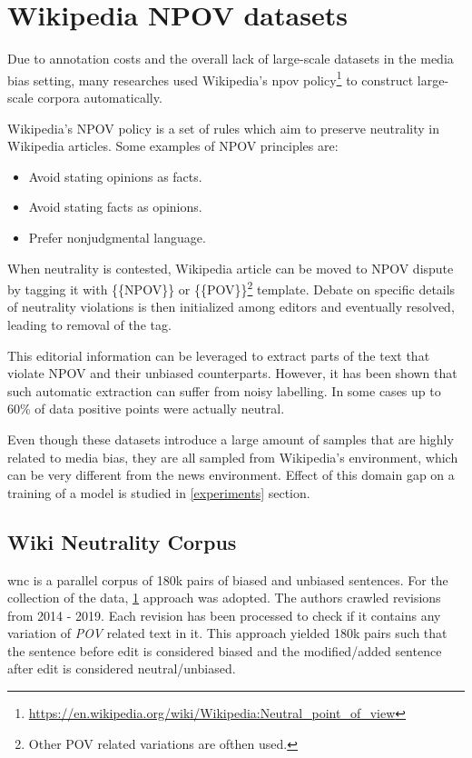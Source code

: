 \section{Wikipedia NPOV datasets}\label{wiki-npov}
Due to annotation costs and the overall lack of large-scale datasets in the media bias setting, many researches \cite{pryzant2020automatically,recasens2013linguistic,hube2019neural} used Wikipedia's \Gls{npov} policy\footnote{\url{https://en.wikipedia.org/wiki/Wikipedia:Neutral_point_of_view}} to construct large-scale corpora automatically. 

Wikipedia's NPOV policy is a set of rules which aim to preserve neutrality in Wikipedia articles. Some examples of NPOV principles are:
\begin{itemize}
    \item Avoid stating opinions as facts.
    \item Avoid stating facts as opinions.
    \item Prefer nonjudgmental language.
\end{itemize}

When neutrality is contested, Wikipedia article can be moved to NPOV dispute by tagging it with \{\{NPOV\}\} or \{\{POV\}\}\footnote{Other POV related variations are ofthen used.} template. Debate on specific details of neutrality violations is then initialized among editors and eventually resolved, leading to removal of the tag.

This editorial information can be leveraged to extract parts of the text that violate NPOV and their unbiased counterparts. However, it has been shown \cite{hube2019neural,zhong-etal-2021-wikibias-detecting} that such automatic extraction can suffer from noisy labelling. In some cases \cite{hube2019neural} up to 60\% of data positive points were actually neutral.

Even though these datasets introduce a large amount of samples that are highly related to media bias, they are all sampled from Wikipedia's environment, which can be very different from the news environment. Effect of this domain gap on a training of a model is studied in \ref{experiments} section.




\subsection{Wiki Neutrality Corpus}\label{wiki}
\Gls{wnc} \cite{pryzant2020automatically} is a parallel corpus of 180k pairs of biased and unbiased sentences. For the collection of the data, \ref{wiki-npov} approach was adopted. The authors crawled revisions from 2014 - 2019. Each revision has been processed to check if it contains any variation of \textit{POV} related text in it. This approach yielded 180k pairs such that the sentence before edit is considered biased and the modified/added sentence after edit is considered neutral/unbiased.
    
